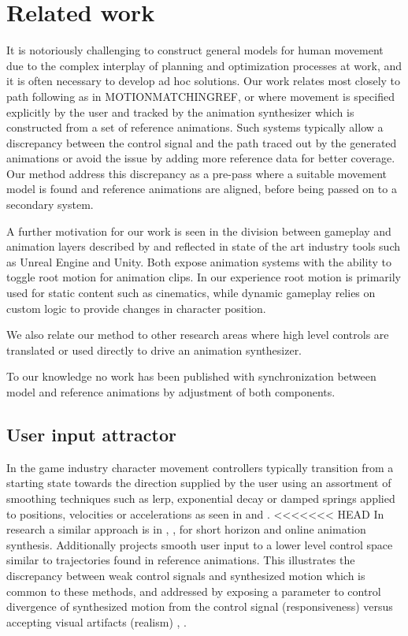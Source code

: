 \section{Related work}
It is notoriously challenging to construct general models for human movement due to the complex interplay of planning and optimization processes at work, and it is often necessary to develop ad hoc solutions. Our work relates most closely to path following as in MOTIONMATCHINGREF, \citep{holden.16} or \citep{startke20} where movement is specified explicitly by the user and tracked by the animation synthesizer which is constructed from a set of reference animations. Such systems typically allow a discrepancy between the control signal and the path traced out by the generated animations or avoid the issue by adding more reference data for better coverage. Our method address this discrepancy as a pre-pass where a suitable movement model is found and reference animations are aligned, before being passed on to a secondary system.  

A further motivation for our work is seen in the division between gameplay and animation layers described by \citep{holden18} and reflected in state of the art industry tools such as Unreal Engine and Unity. Both expose animation systems with the ability to toggle root motion for animation clips. In our experience root motion is primarily used for static content such as cinematics, while dynamic gameplay relies on custom logic to provide changes in character position. 

We also relate our method to other research areas where high level controls are translated or used directly to drive an animation synthesizer. 

To our knowledge no work has been published with synchronization between model and reference animations by adjustment of both components.

\subsection{User input attractor}
In the game industry character movement controllers typically transition from a starting state towards the direction supplied by the user using an assortment of smoothing techniques such as lerp, exponential decay or damped springs applied to positions, velocities or accelerations as seen in \citep{buttner20} and \citep{holden21}. 
<<<<<<< HEAD
In research a similar approach is in \citep{mccann07}, \citep{holden.16}, \citep{zhang18} for short horizon and online animation synthesis. Additionally \citep{startke20} projects smooth user input to a lower level control space similar to trajectories found in reference animations. This illustrates the discrepancy between weak control signals and synthesized motion which is common to these methods, and addressed by exposing a parameter to control divergence of synthesized motion from the control signal (responsiveness) versus accepting visual artifacts (realism) \citep{clavet16}, \citep{zadziuk16}. 

